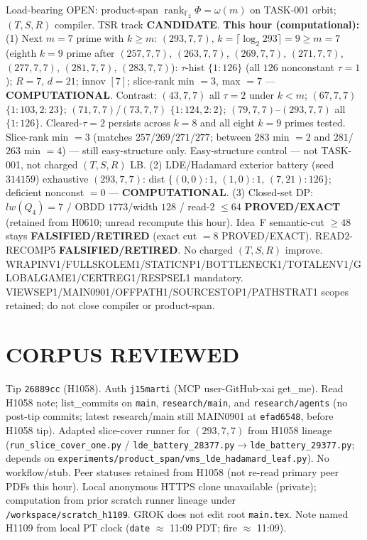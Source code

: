 \documentclass[11pt]{article}
\begin{document}
Load-bearing OPEN: product-span $\operatorname{rank}_{\mathbb F_2}\Phi=\omega(m)$ on TASK-001 orbit;
$(T,S,R)$ compiler. TSR track \textbf{CANDIDATE}.
\textbf{This hour (computational):}
(1) Next $m{=}7$ prime with $k{\ge}m$: $(293,7,7)$, $k=\lceil\log_2 293\rceil=9{\ge}m{=}7$
(eighth $k{=}9$ prime after $(257,7,7)$, $(263,7,7)$, $(269,7,7)$, $(271,7,7)$, $(277,7,7)$, $(281,7,7)$, $(283,7,7)$):
$\tau$-hist $\{1{:}126\}$ (all $126$ nonconstant $\tau{=}1$); $R{=}7$, $d{=}21$; innov $[7]$;
slice-rank min $=3$, max $=7$ --- \textbf{COMPUTATIONAL}.
Contrast: $(43,7,7)$ all $\tau{=}2$ under $k{<}m$; $(67,7,7)$ $\{1{:}103,2{:}23\}$;
$(71,7,7)$/$(73,7,7)$ $\{1{:}124,2{:}2\}$; $(79,7,7)$--$(293,7,7)$ all $\{1{:}126\}$.
Cleared-$\tau{=}2$ persists across $k{=}8$ and all eight $k{=}9$ primes tested.
Slice-rank min $=3$ (matches $257$/$269$/$271$/$277$; between $283$ min $=2$ and $281$/$263$ min $=4$) --- still easy-structure only.
Easy-structure control --- not TASK-001, not charged $(T,S,R)$ LB.
(2) LDE/Hadamard exterior battery (seed~$314159$) exhaustive $(293,7,7)$:
dist $\{(0,0){:}1,\,(1,0){:}1,\,(7,21){:}126\}$; deficient nonconst $=0$ --- \textbf{COMPUTATIONAL}.
(3) Closed-set DP: $lw(Q_4)=7$ / OBDD $1773$/width $128$ / read-$2$ $\le64$
\textbf{PROVED/EXACT} (retained from H0610; unread recompute this hour).
Idea~F semantic-cut $\ge48$ stays \textbf{FALSIFIED/RETIRED} (exact cut $=8$ PROVED/EXACT).
READ2-RECOMP5 \textbf{FALSIFIED/RETIRED}. No charged $(T,S,R)$ improve.
WRAPINV1/FULLSKOLEM1/STATICNP1/BOTTLENECK1/TOTALENV1/GLOBALGAME1/CERTREG1/RESPSEL1 mandatory.
VIEWSEP1/MAIN0901/OFFPATH1/SOURCESTOP1/PATHSTRAT1 scopes retained; do not close compiler or product-span.

\section*{CORPUS REVIEWED}
Tip \texttt{26889cc} (H1058). Auth \texttt{j15marti} (MCP user-GitHub-xai get\_me).
Read H1058 note; list\_commits on \texttt{main}, \texttt{research/main}, and \texttt{research/agents}
(no post-tip commits; latest research/main still MAIN0901 at \texttt{efad6548}, before H1058 tip).
Adapted slice-cover runner for $(293,7,7)$ from H1058 lineage
(\texttt{run\_slice\_cover\_one.py} / \texttt{lde\_battery\_28377.py}$\to$\texttt{lde\_battery\_29377.py};
depends on \texttt{experiments/product\_span/vms\_lde\_hadamard\_leaf.py}).
No workflow/stub. Peer statuses retained from H1058 (not re-read primary peer PDFs this hour).
Local anonymous HTTPS clone unavailable (private);
computation from prior scratch runner lineage under \texttt{/workspace/scratch\_h1109}.
GROK does not edit root \texttt{main.tex}.
Note named H1109 from local PT clock (\texttt{date} $\approx$ 11:09 PDT; fire $\approx$ 11:09).
\end{document}
